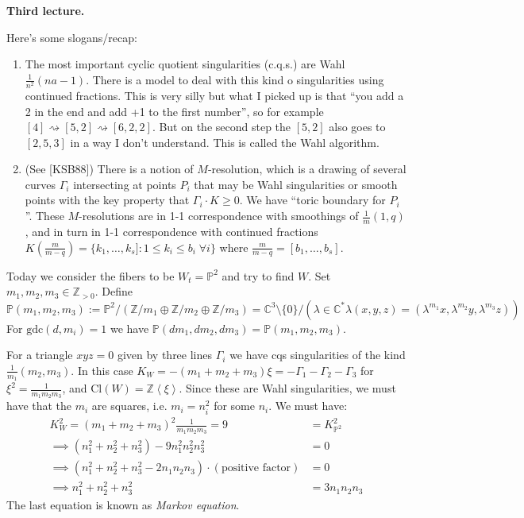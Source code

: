 \medskip\noindent

{\bf Third lecture.}

Here's some slogans/recap:
\begin{enumerate}
\item The most important cyclic quotient singularities (c.q.s.) are Wahl
$\frac{1}{n^2}(na-1)$. There is a model to deal with this kind o singularities
using continued fractions. This is very silly but what I picked up is that ``you
add a 2 in the end and add +1 to the first number'', so for example
$[4]\rightsquigarrow[5,2]\rightsquigarrow[6,2,2]$. But on the second step the
$[5,2]$ also goes to $[2,5,3]$ in a way I don't understand. This is called the
Wahl algorithm.
\item (See [KSB88]) There is a notion of $M$-resolution, which is a drawing of 
several curves $\Gamma_i$ intersecting at points $P_i$ that may be Wahl 
singularities or 
smooth points with the key property that $\Gamma_i\cdot K\geq 0$. We have
``toric boundary for $P_i$''. These $M$-resolutions are in 1-1 correspondence
with smoothings of $\frac{1}{m}(1,q)$, and in turn in 1-1 correspondence with
continued fractions $K\left(\frac{m}{m-q}\right)=\{k_1,\ldots,k_s]:
1\leq k_i\leq b_i\;\forall i\}$ where $\frac{m}{m-q}=[b_1,\ldots,b_s]$.
\end{enumerate}

\medskip\noindent

Today we consider the fibers to be $W_t=\mathbb{P}^2$ and
try to find $W$. Set $m_1,m_2,m_3\in\mathbb{Z}_{>0}$. Define
$$
\mathbb{P}(m_1,m_2,m_3):=
\mathbb{P}^2/(\mathbb{Z}/m_1\oplus\mathbb{Z}/m_2\oplus\mathbb{Z}/m_3)
=\mathbb{C}^3\setminus\{0\}/(\lambda\in\mathbb{C}^*\lambda(x,y,z)
=(\lambda^{m_1}x,\lambda^{m_2}y,\lambda^{m_3}z))
$$
For $\text{gdc}(d,m_i)=1$ we have
$\mathbb{P}(dm_1,dm_2,dm_3)=\mathbb{P}(m_1,m_2,m_3)$.

For a triangle $xyz=0$ given by three lines $\Gamma_i$ we have cqs singularities
of the kind $\frac{1}{m_1}(m_2,m_3)$. In this case
$K_W=-(m_1+m_2+m_3)\xi=-\Gamma_1-\Gamma_2-\Gamma_3$ for
$\xi^2=\frac{1}{m_1m_2m_3}$, and $\text{Cl}(W)=\mathbb{Z}\left<\xi\right>$.
Since these are Wahl singularities, we must have that the $m_i$ are squares,
i.e. $m_i=n_i^2$ for some $n_i$. We must have:
\begin{align*}
K_W^2=(m_1+m_2+m_3)^2\frac{1}{m_1m_2m_3}=9&=K^2_{\mathbb{P}^2}\\
\implies (n_1^2+n_2^2+n_3^2)-9n_1^2n_2^2n_3^2&=0\\
\implies (n_1^2+n_2^2+n_3^2-2n_1n_2n_3)\cdot(\text{positive factor})&=0\\
\implies n_1^2+n_2^2+n_3^2&=3n_1n_2n_3
\end{align*}
The last equation is known as {\it Markov equation}.

